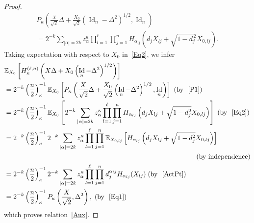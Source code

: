 \documentclass[10pt]{amsart}
\theoremstyle{definition}\newtheorem{defi}[theo]{Definition}\newtheorem{rema}[theo]{Remark}\newtheorem{exam}[theo]{Example}\newtheorem{exem}[theo]{Example}\newtheorem{nota}[theo]{Notation}
\DeclareMathOperator{\Id}{Id}
\newcommand{\EX}[2]{\mathbb{E}_{#1}\left[#2\right]}
\begin{document}
\begin{proof}
\begin{multline}\label{Eq2}
P_{\kappa}\left(\frac{X}{\sqrt{2}}\Delta+\frac{X_0}{\sqrt{2}}\left(\Id_n-\Delta^2\right)^{1/2},\Id_n\right) \\
= 2^{-k}\sum_{|\alpha|=2k} z_{\alpha}^{\kappa} \prod_{l=1}^{\ell}\prod_{j=1}^{n} H_{\alpha_{lj}}\left(d_jX_{lj}+\sqrt{1-d_j^{\,2}}X_{0,lj}\right).
\end{multline}
Taking expectation with respect to $X_0$ in~\eqref{Eq2}, we infer
\begin{align*}
&\EX{X_0}{H_{\kappa}^{(\ell,n)}\left(X\Delta+X_0\left(\Id_n-\Delta^2\right)^{1/2}\right)}\\
&= 2^{-k}\left(\frac{n}{2}\right)_{\kappa}^{-1}
\EX{X_0}{P_{\kappa}\left(\frac{X}{\sqrt{2}}\Delta+\frac{X_0}{\sqrt{2}}\left(\Id_n-\Delta^2\right)^{1/2},\Id_n\right) } \; (\text{by }~\eqref{P1})\\
&= 2^{-k}\left(\frac{n}{2}\right)_{\kappa}^{-1} \EX{X_0}{2^{-k}\sum_{|\alpha|=2k} z_{\alpha}^{\kappa} \prod_{l=1}^{\ell}\prod_{j=1}^{n} H_{\alpha_{lj}}\left(d_jX_{lj}+\sqrt{1-d_j^2}X_{0,lj}\right)} \; (\text{by }~\eqref{Eq2}) \\
&= 2^{-k}\left(\frac{n}{2}\right)_{\kappa}^{-1} 2^{-k}\sum_{|\alpha|=2k} z_{\alpha}^{\kappa} \prod_{l=1}^{\ell}\prod_{j=1}^{n} \EX{X_{0,lj}}{ H_{\alpha_{lj}}\left(d_jX_{lj}+\sqrt{1-d_j^2}X_{0,lj}\right)} \\
&\hspace{10cm}(\text{by independence})\\
&=2^{-k}\left(\frac{n}{2}\right)_{\kappa}^{-1} 2^{-k}\sum_{|\alpha|=2k} z_{\alpha}^{\kappa} \prod_{l=1}^{\ell}\prod_{j=1}^{n} d_j^{\alpha_{lj}}H_{\alpha_{lj}}(X_{lj}) \; (\text{by }~\eqref{ActPt}) \\
&= 2^{-k}\left(\frac{n}{2}\right)_{\kappa}^{-1} P_{\kappa}\left(\frac{X}{\sqrt{2}},\Delta^2\right), \; (\text{by }~\eqref{Eq1})
\end{align*}
which proves relation~\eqref{Aux}.
\end{proof}
\end{document}
